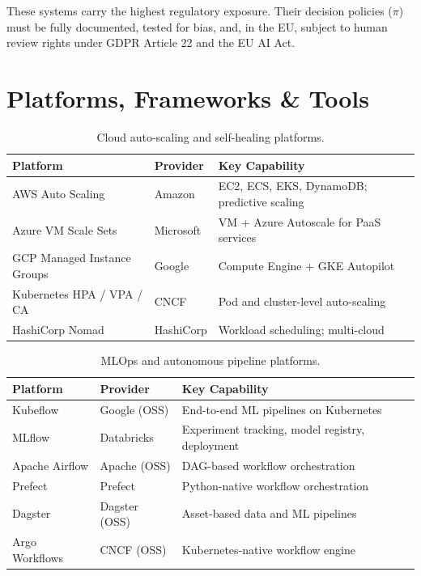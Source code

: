 \documentclass[12pt, a4paper]{article}
\begin{document}
These systems carry the highest regulatory exposure. Their decision policies ($\pi$) must be fully documented, tested for bias, and, in the EU, subject to human review rights under GDPR Article 22 and the EU AI Act.

\section{Platforms, Frameworks \& Tools}\label{sec:platforms}

\begin{table}[ht]
\centering
\caption{Cloud auto-scaling and self-healing platforms.}
\label{tab:platforms-cloud}
\begin{tabular}{lll}
\toprule
\textbf{Platform} & \textbf{Provider} & \textbf{Key Capability} \\
\midrule
AWS Auto Scaling                & Amazon   & EC2, ECS, EKS, DynamoDB; predictive scaling \\
Azure VM Scale Sets             & Microsoft & VM + Azure Autoscale for PaaS services \\
GCP Managed Instance Groups     & Google   & Compute Engine + GKE Autopilot \\
Kubernetes HPA / VPA / CA       & CNCF     & Pod and cluster-level auto-scaling \\
HashiCorp Nomad                 & HashiCorp & Workload scheduling; multi-cloud \\
\bottomrule
\end{tabular}
\end{table}

\begin{table}[ht]
\centering
\caption{MLOps and autonomous pipeline platforms.}
\label{tab:platforms-mlops}
\begin{tabular}{lll}
\toprule
\textbf{Platform} & \textbf{Provider} & \textbf{Key Capability} \\
\midrule
Kubeflow        & Google (OSS)   & End-to-end ML pipelines on Kubernetes \\
MLflow          & Databricks     & Experiment tracking, model registry, deployment \\
Apache Airflow  & Apache (OSS)   & DAG-based workflow orchestration \\
Prefect         & Prefect        & Python-native workflow orchestration \\
Dagster         & Dagster (OSS)  & Asset-based data and ML pipelines \\
Argo Workflows  & CNCF (OSS)     & Kubernetes-native workflow engine \\
\bottomrule
\end{tabular}
\end{table}
\end{document}

